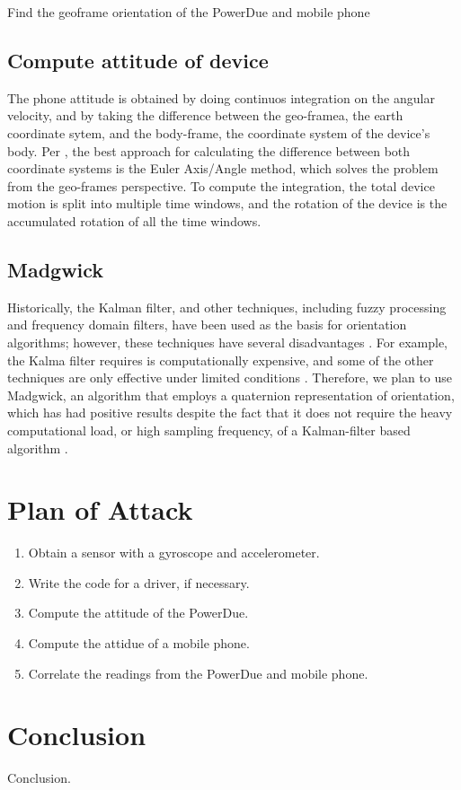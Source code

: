 \documentclass[journal]{IEEEtranTIE}
\begin{document}
Find the geoframe orientation of the PowerDue and mobile phone

\subsection{Compute attitude of device}

The phone attitude is obtained by doing continuos integration on the angular
velocity, and by taking the difference between the geo-framea, the earth
coordinate sytem, and the body-frame, the coordinate system of the device's
body. Per \cite{PhoneAttitude}, the best approach for calculating the difference
between both coordinate systems is the Euler Axis/Angle method, which solves the
problem from the geo-frames perspective. To compute the integration, the total
device motion is split into multiple time windows, and the rotation of the
device is the accumulated rotation of all the time windows.

\subsection{Madgwick}

Historically, the Kalman filter, and other techniques, including fuzzy
processing and frequency domain filters, have been used as the basis for
orientation algorithms; however, these techniques have several disadvantages
\cite{Madgwick}. For example, the Kalma filter requires is computationally
expensive, and some of the other techniques are only effective under limited
conditions \cite{Madgwick}. Therefore, we plan to use Madgwick, an algorithm
that employs a quaternion representation of orientation, which has had positive
results despite the fact that it does not require the heavy computational load,
or high sampling frequency, of a Kalman-filter based algorithm \cite{Madgwick}.

\section{Plan of Attack}

\begin{enumerate}
\item Obtain a sensor with a gyroscope and accelerometer.
\item Write the code for a driver, if necessary.
\item Compute the attitude of the PowerDue.
\item Compute the attidue of a mobile phone.
\item Correlate the readings from the PowerDue and mobile phone.
\end{enumerate}

\section{Conclusion}

Conclusion.



\ %
\end{document}
